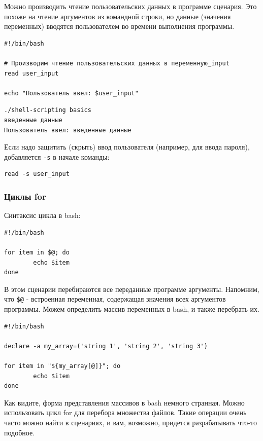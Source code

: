 \documentclass[12pt]{article}
\begin{document}
Можно производить чтение пользовательских данных в программе сценария.
Это похоже на чтение аргументов из командной строки, но данные (значения
переменных) вводятся пользователем во времени выполнения программы.

\begin{verbatim}
#!/bin/bash

# Производим чтение пользовательских данных в переменную_input
read user_input

echo "Пользователь ввел: $user_input"
\end{verbatim}

\begin{verbatim}
./shell-scripting basics
введенные данные
Пользователь ввел: введенные данные
\end{verbatim}

Если надо защитить (скрыть) ввод пользователя (например, для ввода
пароля), добавляется \texttt{-s} в начале команды:

\begin{verbatim}
read -s user_input
\end{verbatim}

\hypertarget{for-loops}{%
\subsubsection{\texorpdfstring{\protect\hyperlink{for-loops}{}Циклы
for}{Циклы for}}\label{for-loops}}

Синтаксис цикла в bash:

\begin{verbatim}
#!/bin/bash

for item in $@; do
        echo $item
done
\end{verbatim}

В этом сценарии перебираются все переданные программе аргументы.
Напомним, что \texttt{\$@} - встроенная переменная, содержащая значения
всех аргументов программы. Можем определить массив переменных в bash, и
также перебрать их.

\begin{verbatim}
#!/bin/bash

declare -a my_array=('string 1', 'string 2', 'string 3')

for item in "${my_array[@]}"; do
        echo $item
done
\end{verbatim}

Как видите, форма представления массивов в bash немного странная. Можно
использовать цикл for для перебора множества файлов. Такие операции
очень часто можно найти в сценариях, и вам, возможно, придется
разрабатывать что-то подобное.
\end{document}
